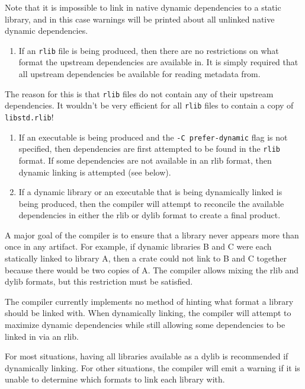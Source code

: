 \documentclass[]{article}
\begin{document}
Note that it is impossible to link in native dynamic dependencies to a
static library, and in this case warnings will be printed about all
unlinked native dynamic dependencies.

\begin{enumerate}
\def\labelenumi{\arabic{enumi}.}
\setcounter{enumi}{1}
\itemsep1pt\parskip0pt
\item
  If an \texttt{rlib} file is being produced, then there are no
  restrictions on what format the upstream dependencies are available
  in. It is simply required that all upstream dependencies be available
  for reading metadata from.
\end{enumerate}

The reason for this is that \texttt{rlib} files do not contain any of
their upstream dependencies. It wouldn't be very efficient for all
\texttt{rlib} files to contain a copy of \texttt{libstd.rlib}!

\begin{enumerate}
\def\labelenumi{\arabic{enumi}.}
\setcounter{enumi}{2}
\item
  If an executable is being produced and the \texttt{-C prefer-dynamic}
  flag is not specified, then dependencies are first attempted to be
  found in the \texttt{rlib} format. If some dependencies are not
  available in an rlib format, then dynamic linking is attempted (see
  below).
\item
  If a dynamic library or an executable that is being dynamically linked
  is being produced, then the compiler will attempt to reconcile the
  available dependencies in either the rlib or dylib format to create a
  final product.
\end{enumerate}

A major goal of the compiler is to ensure that a library never appears
more than once in any artifact. For example, if dynamic libraries B and
C were each statically linked to library A, then a crate could not link
to B and C together because there would be two copies of A. The compiler
allows mixing the rlib and dylib formats, but this restriction must be
satisfied.

The compiler currently implements no method of hinting what format a
library should be linked with. When dynamically linking, the compiler
will attempt to maximize dynamic dependencies while still allowing some
dependencies to be linked in via an rlib.

For most situations, having all libraries available as a dylib is
recommended if dynamically linking. For other situations, the compiler
will emit a warning if it is unable to determine which formats to link
each library with.
\end{document}

